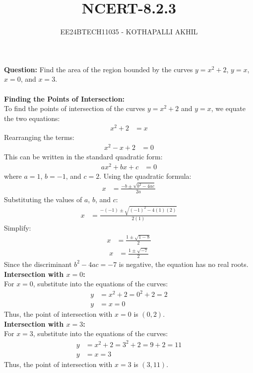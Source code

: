 \documentclass[article]{IEEEtran}
\numberwithin{figure}{enumi}
\begin{document}

\title{NCERT-8.2.3}
\author{EE24BTECH11035 - KOTHAPALLI AKHIL}
{\let\newpage\relax\maketitle\vspace{-1.20cm}}
\noindent\textbf{Question: }  
Find the area of the region bounded by the curves $y = x^2 + 2$, $y = x$, $x = 0$, and $x = 3$.\\
\solution \\
\noindent\textbf{Finding the Points of Intersection:}\\
To find the points of intersection of the curves $y = x^2 + 2$ and $y = x$, we equate the two equations:
\begin{align}
x^2 + 2 &= x
\end{align}
Rearranging the terms:
\begin{align}
x^2 - x + 2 &= 0
\end{align}
This can be written in the standard quadratic form:
\begin{align}
ax^2 + bx + c &= 0
\end{align}
where $a = 1$, $b = -1$, and $c = 2$. Using the quadratic formula:
\begin{align}
x &= \frac{-b \pm \sqrt{b^2 - 4ac}}{2a}
\end{align}
Substituting the values of $a$, $b$, and $c$:
\begin{align}
x &= \frac{-(-1) \pm \sqrt{(-1)^2 - 4(1)(2)}}{2(1)}
\end{align}
Simplify:
\begin{align}
x &= \frac{1 \pm \sqrt{1 - 8}}{2}
\end{align}
\begin{align}
x &= \frac{1 \pm \sqrt{-7}}{2}
\end{align}
Since the discriminant $b^2 - 4ac = -7$ is negative, the equation has no real roots.\\

\noindent\textbf{Intersection with $x = 0$:}\\
For $x = 0$, substitute into the equations of the curves:
\begin{align}
y &= x^2 + 2 = 0^2 + 2 = 2 \\
y &= x = 0
\end{align}
Thus, the point of intersection with $x = 0$ is $(0, 2)$.\\

\noindent\textbf{Intersection with $x = 3$:}\\
For $x = 3$, substitute into the equations of the curves:
\begin{align}
y &= x^2 + 2 = 3^2 + 2 = 9 + 2 = 11 \\
y &= x = 3
\end{align}
Thus, the point of intersection with $x = 3$ is $(3, 11)$.\\
\end{document}
